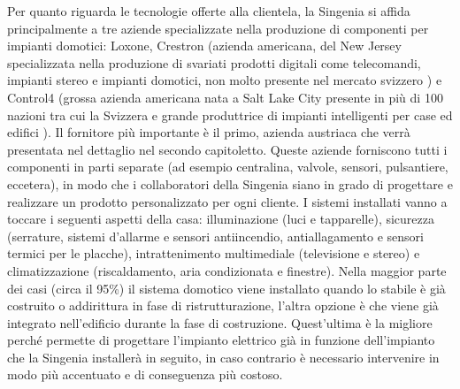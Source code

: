 Per quanto riguarda le tecnologie offerte alla clientela, la Singenia si affida principalmente a tre aziende specializzate nella produzione di componenti per impianti domotici: Loxone, Crestron (azienda americana, del New Jersey specializzata nella produzione di svariati prodotti digitali come telecomandi, impianti stereo e impianti domotici, non molto presente nel mercato svizzero ) e Control4 (grossa azienda americana nata a Salt Lake City presente in più di 100 nazioni tra cui la Svizzera e grande produttrice di impianti intelligenti per case ed edifici ). Il fornitore più importante è il primo, azienda austriaca che verrà presentata nel dettaglio nel secondo capitoletto. Queste aziende forniscono tutti i componenti in parti separate (ad esempio centralina, valvole, sensori, pulsantiere, eccetera), in modo che i collaboratori della Singenia siano in grado di progettare e realizzare un prodotto personalizzato per ogni cliente.
I sistemi installati vanno a toccare i seguenti aspetti della casa: illuminazione (luci e tapparelle), sicurezza (serrature, sistemi d’allarme e sensori antiincendio, antiallagamento e sensori termici per le placche), intrattenimento multimediale (televisione e stereo) e climatizzazione (riscaldamento, aria condizionata e finestre). 
Nella maggior parte dei casi (circa il 95\%) il sistema domotico viene installato quando lo stabile è già costruito o addirittura in fase di ristrutturazione, l’altra opzione è che viene già integrato nell’edificio durante la fase di costruzione. Quest’ultima è la migliore perché permette di progettare l’impianto elettrico già in funzione dell’impianto che la Singenia installerà in seguito, in caso contrario è necessario intervenire in modo più accentuato e di conseguenza più costoso.
